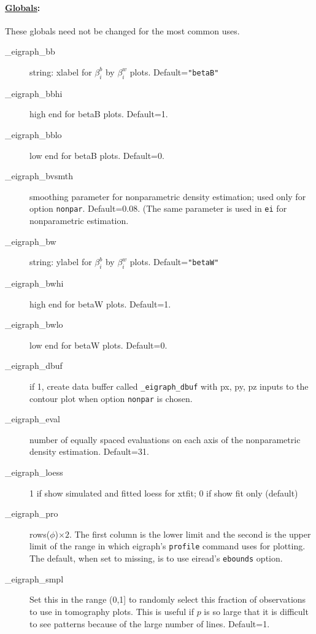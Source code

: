 \documentclass[11pt,titlepage]{article}
\begin{document}
\paragraph{\underline{Globals}:} These globals need
not be changed for the most common uses.
\begin{description}
\item[\_eigraph\_bb] string: xlabel for $\beta_i^b$ by $\beta_i^w$
  plots. Default=\texttt{"betaB"}

\item[\_eigraph\_bbhi] high end for betaB plots. Default=1.

\item[\_eigraph\_bblo] low end for betaB plots. Default=0.

\item[\_eigraph\_bvsmth] smoothing parameter for nonparametric density
  estimation; used only for option \texttt{nonpar}.  Default=0.08.
  (The same parameter is used in \texttt{ei} for nonparametric
  estimation.

\item[\_eigraph\_bw] string: ylabel for $\beta_i^b$ by $\beta_i^w$
  plots.  Default=\texttt{"betaW"}

\item[\_eigraph\_bwhi] high end for betaW plots. Default=1.

\item[\_eigraph\_bwlo] low end for betaW plots. Default=0.

\item[\_eigraph\_dbuf] if 1, create data buffer called
  \texttt{\_eigraph\_dbuf} with px, py, pz inputs to the contour plot
  when option \texttt{nonpar} is chosen.

\item[\_eigraph\_eval] number of equally spaced evaluations on each
  axis of the nonparametric density estimation. Default=31.

\item[\_eigraph\_loess] 1 if show simulated and fitted loess for
  xtfit; 0 if show fit only (default)

\item[\_eigraph\_pro] rows($\phi$)$\times 2$.  The first column is the
  lower limit and the second is the upper limit of the range in which
  eigraph's \texttt{profile} command uses for plotting.  The default,
  when set to missing, is to use eiread's \texttt{ebounds} option.

\item[\_eigraph\_smpl] Set this in the range (0,1] to randomly select
  this fraction of observations to use in tomography plots.  This is
  useful if $p$ is so large that it is difficult to see patterns
  because of the large number of lines.  Default=1.


\end{description}
\end{document}
